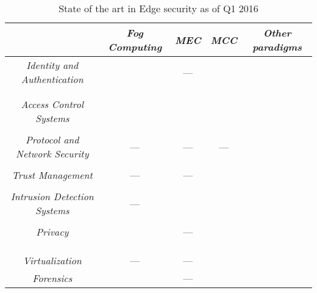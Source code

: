 \documentclass[twocolumn,preprint,3p]{elsarticle}
\begin{document}
\begin{table*}[!htb]
\centering
\begin{scriptsize}
\begin{tabular}{|c|c|c|c|c|}
  \hline
& \textit{Fog Computing} & \textit{MEC} & \textit{MCC} & \textit{Other paradigms} \\
  \hline
  \textit{Identity and Authentication} &
  \cite{StojmenovicFSec05}\cite{Ibrahim16} &
  --- &
  \makecell{\cite{Donald15}\cite{Tsai15}\cite{Shouhuai16} \\ \cite{Bouzefrane14}\cite{Yang2015Hand}\cite{McCarthy15}} &
  \makecell{\cite{Toosi14}\cite{Touceda15}\cite{Zeng2010} \\ \cite{Habib15}} \\
  \hline
  \textit{Access Control Systems} &
  \cite{HuangX14}\cite{StojmenovicFSec05}\cite{Dsouza14} &
  \cite{Vassilakis2016a} &
  \cite{McCarthy15} &
  \makecell{\cite{Li15::Authe}\cite{Elsayed15}\cite{Almutairi12} \\ \cite{Liqun15}}\\
  \hline
  \textit{Protocol and Network Security} &
  --- &
  --- &
  --- &
  \makecell{\cite{HuangX14}\cite{Gorantla2010}\cite{Pimentel201547} \\ \cite{AhmadSDN15}\cite{Kreutz15}\cite{YongNFV15}}\\
  \hline
  \textit{Trust Management} &
  --- &
  --- &
  \cite{Petri12}\cite{ChenT13}\cite{HussainT14} &
  \makecell{\cite{Shang12}\cite{Yan2014120}\cite{Corradini15} \\ \cite{Kantert15}\cite{FigueroaUS15}\cite{Bennani14}}\\
  \hline
  \textit{Intrusion Detection Systems} &
  --- &
  \cite{Mtibaa15} &
  \cite{Gai15}\cite{Shi15} &
  \makecell{\cite{Pitropakis15}\cite{AhmadSDN15}\cite{LuoFIDS13} \\ \cite{Encina14}}\\
  \hline
  \textit{Privacy} &
  \cite{StojmenovicFSec05} &
  --- &
  \makecell{\cite{Tsai15}\cite{HussainT14}\cite{Ravichandran15} \\ \cite{ZhangMCC15}\cite{Seneviratne13}\cite{Hassan15} \\ \cite{Abdo15}\cite{HuangVN16}}&
  \makecell{\cite{Liqun15}\cite{CruzSP15}\cite{Ali15} \\ \cite{Sun15}\cite{Page14}}\\
  \hline
  \textit{Virtualization} &
  --- &
  --- &
  \cite{Hao15}\cite{Dhanya15}\cite{Borcea15} &
  \cite{Lombardi2014} \\
  \hline
  \textit{Forensics} &
  \cite{WangF15} &
  --- &
  \cite{ZawoadF15} &
  \cite{Pichan15} \\
  \hline
\end{tabular}
\end{scriptsize}
\caption{State of the art in Edge security as of Q1 2016}\label{T:SotA}
\end{table*}
\end{document}
